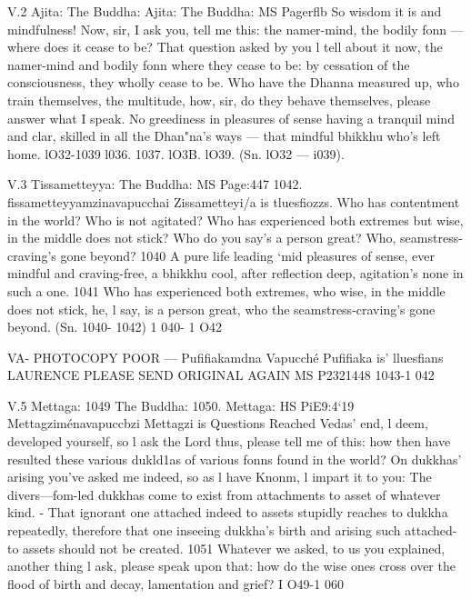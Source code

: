    
   
   V.2
   Ajita:
   The Buddha:
   Ajita:
   The Buddha:
   MS Pagerﬂb
   So wisdom it is and mindfulness!
   Now, sir, I ask you, tell me this:
   the namer-mind, the bodily fonn —
   where does it cease to be?
   That question asked by you
   l tell about it now,
   the namer-mind and bodily fonn
   where they cease to be:
   by cessation of the consciousness,
   they wholly cease to be.
   Who have the Dhanna measured up,
   who train themselves, the multitude,
   how, sir, do they behave themselves,
   please answer what I speak.
   No greediness in pleasures of sense
   having a tranquil mind and clar,
   skilled in all the Dhan"na's ways —
   that mindful bhikkhu who's left home.
   lO32-1039
   l036.
   1037.
   lO3B.
   lO39.
   (Sn. lO32 — i039).
   
   
   
   V.3
   Tissametteyya:
   The Buddha:
   MS Page:447
   1042.
   ﬁssametteyyamzinavapucchai
   Zissametteyi/a is tluesﬁozzs.
   Who has contentment in the world?
   Who is not agitated?
   Who has experienced both extremes
   but wise, in the middle does not stick?
   Who do you say's a person great?
   Who, seamstress-craving's gone beyond? 1040
   A pure life leading `mid pleasures of sense,
   ever mindful and craving-free,
   a bhikkhu cool, after reﬂection deep,
   agitation's none in such a one. 1041
   Who has experienced both extremes,
   who wise, in the middle does not stick,
   he, l say, is a person great,
   who the seamstress-craving's gone beyond.
   (Sn. 1040- 1042)
   1 040- 1 O42
   
   
   
   VA-
   PHOTOCOPY POOR —
   Puﬁﬁakamdna Vapucché
   Puﬁﬁaka is' lluesﬁans
   LAURENCE PLEASE SEND ORIGINAL AGAIN
   MS P2321448
   1043-1 042
   
   
   
   V.5
   Mettaga:
   1049
   The Buddha:
   1050.
   Mettaga:
   HS PiE9:4`19
   Mettagziménavapuccbzi
   Mettagzi is Questions
   Reached Vedas' end, l deem, developed yourself,
   so l ask the Lord thus, please tell me of this:
   how then have resulted these various dukld1as
   of various fonns found in the world?
   On dukkhas' arising you've asked me indeed,
   so as l have Knonm, l impart it to you:
   The divers—fom-led dukkhas come to exist
   from attachments to asset of whatever kind. -
   That ignorant one attached indeed to assets
   stupidly reaches to dukkha repeatedly,
   therefore that one inseeing dukkha's birth and arising
   such attached-to assets should not be created. 1051
   Whatever we asked, to us you explained,
   another thing l ask, please speak upon that:
   how do the wise ones cross over the ﬂood
   of birth and decay, lamentation and grief?
   I O49-1 060
   

